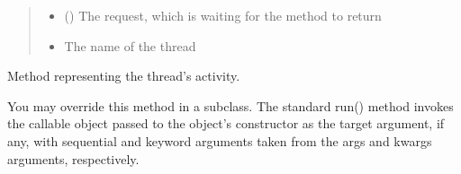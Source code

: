 \documentclass[letterpaper,10pt,english]{sphinxmanual}
\begin{document}
\begin{savenotes}
\begin{fulllineitems}
\begin{quote}
\begin{description}
\begin{itemize}
\item {} 
\sphinxAtStartPar
{} (\sphinxstyleliteralemphasis{\sphinxupquote{{[}}}\sphinxstyleliteralemphasis{\sphinxupquote{{]}}}) \textendash{} The request, which is waiting for the method to return

\item {} 
\sphinxAtStartPar
{} \textendash{} The name of the thread

\end{itemize}

\end{description}\end{quote}

\begin{savenotes}\begin{fulllineitems}
\label{\detokenize{eezz:eezz.websocket.TAsyncHandler.run}}
\pysigstartsignatures
{}
\pysigstopsignatures
\sphinxAtStartPar
Method representing the thread’s activity.

\sphinxAtStartPar
You may override this method in a subclass. The standard run() method
invokes the callable object passed to the object’s constructor as the
target argument, if any, with sequential and keyword arguments taken
from the args and kwargs arguments, respectively.

\end{fulllineitems}\end{savenotes}


\end{fulllineitems}\end{savenotes}

\end{document}
